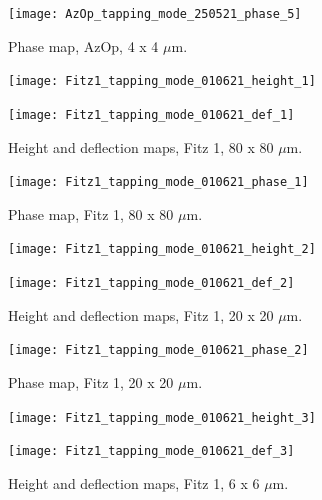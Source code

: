 \begin{figure}[H]
\centering
  \texttt{[image: AzOp\_tapping\_mode\_250521\_phase\_5]}
\caption[Phase map, AzOp]{Phase map, AzOp, 4 x 4 $\mu$m.}
\label{fig:afm_azop_phase_4}
\end{figure}



\begin{figure}[H]
\centering
\begin{minipage}{.45\textwidth}
  \centering
  \texttt{[image: Fitz1\_tapping\_mode\_010621\_height\_1]}
\end{minipage}
\begin{minipage}{.45\textwidth}
  \centering
  \texttt{[image: Fitz1\_tapping\_mode\_010621\_def\_1]}
\end{minipage}
\caption[Height and deflection maps, Fitz 1]{Height and deflection maps, Fitz 1, 80 x 80 $\mu$m.}
\label{fig:afm_fitz1_height_def_1}
\end{figure}

\begin{figure}[H]
\centering
  \texttt{[image: Fitz1\_tapping\_mode\_010621\_phase\_1]}
\caption[Phase map, Fitz 1]{Phase map, Fitz 1, 80 x 80 $\mu$m.}
\label{fig:afm_fitz1_phase_1}
\end{figure}


\begin{figure}[H]
\centering
\begin{minipage}{.45\textwidth}
  \centering
  \texttt{[image: Fitz1\_tapping\_mode\_010621\_height\_2]}
\end{minipage}
\begin{minipage}{.45\textwidth}
  \centering
  \texttt{[image: Fitz1\_tapping\_mode\_010621\_def\_2]}
\end{minipage}
\caption[Height and deflection maps, Fitz 1]{Height and deflection maps, Fitz 1, 20 x 20 $\mu$m.}
\label{fig:afm_fitz1_height_def_2}
\end{figure}

\begin{figure}[H]
\centering
  \texttt{[image: Fitz1\_tapping\_mode\_010621\_phase\_2]}
\caption[Phase map, Fitz 1]{Phase map, Fitz 1, 20 x 20 $\mu$m.}
\label{fig:afm_fitz1_phase_2}
\end{figure}


\begin{figure}[H]
\centering
\begin{minipage}{.45\textwidth}
  \centering
  \texttt{[image: Fitz1\_tapping\_mode\_010621\_height\_3]}
\end{minipage}
\begin{minipage}{.45\textwidth}
  \centering
  \texttt{[image: Fitz1\_tapping\_mode\_010621\_def\_3]}
\end{minipage}
\caption[Height and deflection maps, Fitz 1]{Height and deflection maps, Fitz 1, 6 x 6 $\mu$m.}
\label{fig:afm_fitz1_height_def_3}
\end{figure}

